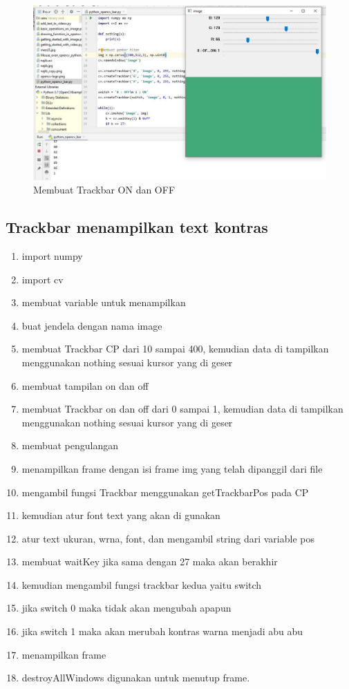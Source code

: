 \newpage
\begin{figure}[ht]
\centering
\includegraphics[scale=0.42]{figures/2,32,1.jpg}
\caption{Membuat Trackbar ON dan OFF}
\label{contoh}
\end{figure}



\newpage
\subsection{Trackbar menampilkan text kontras}

\begin{enumerate}
	\item import numpy
	\item import cv
	\item membuat variable untuk menampilkan
	\item buat jendela dengan nama image
	\item membuat Trackbar CP dari 10 sampai 400, kemudian data di tampilkan menggunakan nothing sesuai kursor yang di geser
	\item membuat tampilan on dan off
	\item membuat Trackbar on dan off dari 0 sampai 1, kemudian data di tampilkan menggunakan nothing sesuai kursor yang di geser
	\item membuat pengulangan 
	\item menampilkan frame dengan isi frame img yang telah dipanggil dari file
	\item mengambil fungsi Trackbar menggunakan getTrackbarPos pada CP
	\item kemudian atur font text yang akan di gunakan
	\item atur text ukuran, wrna, font, dan mengambil string dari variable pos
	\item membuat waitKey jika sama dengan 27 maka akan berakhir
	\item kemudian mengambil fungsi trackbar kedua yaitu switch 
	\item jika switch 0 maka tidak akan mengubah apapun
	\item jika switch 1 maka akan merubah kontras warna menjadi abu abu
	\item menampilkan frame
	\item destroyAllWindows digunakan untuk menutup frame.
\end{enumerate}

